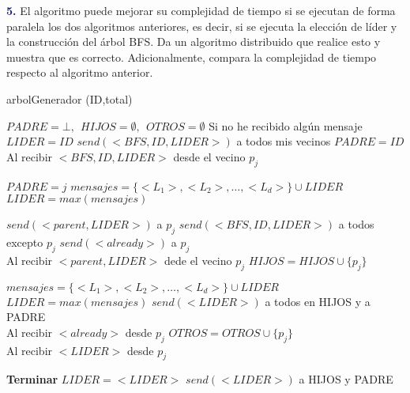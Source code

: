 \newpage
\textbf{\textcolor{MidnightBlue}{5.}} El algoritmo puede mejorar su complejidad de tiempo si se ejecutan de forma paralela
los dos algoritmos anteriores, es decir, si se ejecuta la elección de líder y la construcción del árbol BFS. Da un algoritmo distribuido que realice esto y muestra que es correcto. Adicionalmente, compara la complejidad de tiempo respecto al algoritmo anterior.

\begin{algorithm}
    \caption{arbolGenerador (ID,total)}\label{alg:cap}
    \begin{algorithmic}[1]
        \State $PADRE = \bot, \ \ HIJOS = \emptyset, \ \ OTROS = \emptyset$
        \State Si no he recibido algún mensaje
            \State $LIDER = ID$ 
            \State $send(<BFS,ID,LIDER>)$ a todos mis vecinos
            \State $PADRE = ID$
        \EndIf \\


        \State Al recibir $<BFS,ID, LIDER>$ desde el vecino $p_j$

            \State $PADRE = j$
            \State $mensajes=\{<L_1>,<L_2>,\dots,<L_d>\} \cup LIDER$
            \State $LIDER = max(mensajes)$
            
            \State $send(<parent,LIDER>)$ a $p_j$
            \State $send(<BFS,ID, LIDER>)$ a todos excepto $p_j$
        \Else
            \State $send(<already>)$ a $p_j$
        \EndIf\\


        \State Al recibir $<parent,LIDER>$ dede el vecino $p_j$
        \State $HIJOS = HIJOS \cup \{p_j\}$
        
        \State $mensajes=\{<L_1>,<L_2>,\dots,<L_d>\} \cup LIDER$
        \State $LIDER = max(mensajes)$
        \State $send(<LIDER>)$ a todos en HIJOS y a PADRE\\

        \State Al recibir $<already>$ desde $p_j$
        \State $OTROS = OTROS \cup \{p_j\}$\\


        \State Al recibir $<LIDER>$ desde $p_j$
        
            \State \textbf{Terminar}
        \Else
            \State $LIDER = <LIDER>$
            \State $send(<LIDER>)$ a HIJOS y PADRE
        \EndIf

    \end{algorithmic}
\end{algorithm}    

